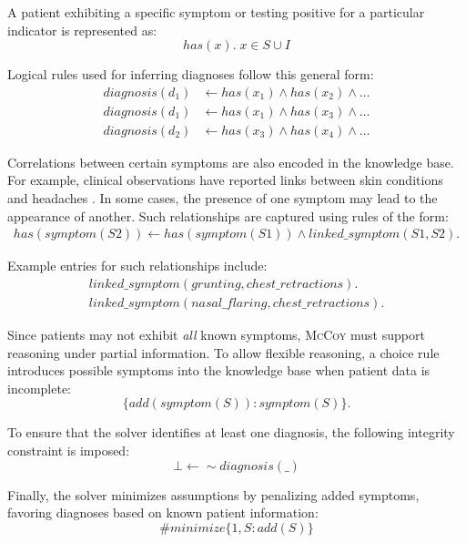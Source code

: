 \documentclass[11pt,leqno]{amsart}
\newcommand{\sys}{\textsc{McCoy}\xspace}
\begin{document}
A patient exhibiting a specific symptom or testing positive for a particular indicator is represented as:
\begin{equation}
    has(x). \; x \in S \cup I
\end{equation}

Logical rules used for inferring diagnoses follow this general form:
\begin{align}
    diagnosis(d_1) & \longleftarrow has(x_1) \land has(x_2) \land \dots \\
    diagnosis(d_1) & \longleftarrow has(x_1) \land has(x_3) \land \dots \\
    diagnosis(d_2) & \longleftarrow has(x_3) \land has(x_4) \land \dots
\end{align}

Correlations between certain symptoms are also encoded in the knowledge base. 
For example, clinical observations have reported links between skin conditions and headaches \cite{migraine-hives}. 
In some cases, the presence of one symptom may lead to the appearance of another. 
Such relationships are captured using rules of the form:
\begin{align}
    has(symptom(S2)) \longleftarrow has(symptom(S1)) \land linked\_symptom(S1, S2).
\end{align}

Example entries for such relationships include:
\begin{align}
    linked\_symptom(grunting, chest\_retractions).\\
    linked\_symptom(nasal\_flaring, chest\_retractions).
\end{align}

Since patients may not exhibit \textit{all} known symptoms, 
\sys must support reasoning under partial information. 
To allow flexible reasoning, a choice rule introduces possible symptoms 
into the knowledge base when patient data is incomplete:
\begin{equation}
    \{ add(symptom(S)) : symptom(S) \}.
\end{equation}

To ensure that the solver identifies at least one diagnosis, 
the following integrity constraint is imposed:
\begin{equation}
    \bot \longleftarrow \sim diagnosis(\_)
\end{equation}

Finally, the solver minimizes assumptions by penalizing added symptoms, 
favoring diagnoses based on known patient information:
\begin{equation}
    \#minimize \{ 1, S : add(S) \}
\end{equation}
\end{document}
